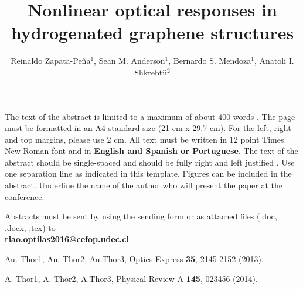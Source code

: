 \documentclass{./RiaoOptilas2016}
\begin{document}
\title{Nonlinear optical responses in hydrogenated graphene structures}

\author{Reinaldo Zapata-Pe\~na$^{1}$, Sean M. Anderson$^{1}$, Bernardo S. 
Mendoza$^{1}$, Anatoli I. Shkrebtii$^{2}$ }
\bigskip

\address{
$^1$Centro de Investigaciones en \'Optica, Le\'on, Guanajuato 37150, M\'exico\\
\bigskip
$^2$University of Ontario, Institute of Technology, Oshawa, ON, L1H 7L7, Canada}


The text of the abstract is limited to a maximum of about 400 words \cite{Author82}. The page must be formatted in an A4 standard size (21 cm x 29.7 cm). For the left, right and top margins, please use 2 cm. All text must be written in 12 point Times New Roman font and in \textbf{English and Spanish or Portuguese}. The text of the abstract should be single-spaced and should be fully right and left justified \cite{Author96}. Use one separation line as indicated in this template. Figures can be included in the abstract. Underline the name of the author who will present the paper at the conference.

\bigskip

Abstracts must be sent by using the sending form or as attached files (.doc, .docx, .tex) to \\ \textbf{riao.optilas2016@cefop.udec.cl}




\begin{thebibliography}{99}

 Au. Thor1, Au. Thor2, Au.Thor3, Optics Express \textbf{35}, 2145-2152 (2013).

 A. Thor1, A. Thor2, A.Thor3, Physical Review A \textbf{145}, 023456 (2014).

\end{thebibliography}
\end{document}
